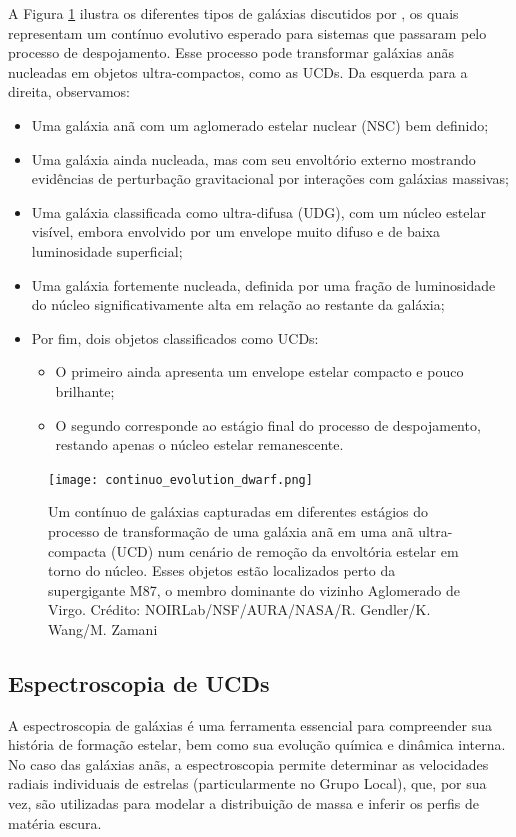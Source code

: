 A Figura \ref{continuo_evolution_dwarf} ilustra os diferentes tipos de galáxias discutidos por \cite{Wang_2023}, os quais representam um contínuo evolutivo esperado para sistemas que passaram pelo processo de despojamento. Esse processo pode transformar galáxias anãs nucleadas em objetos ultra-compactos, como as UCDs. Da esquerda para a direita, observamos:

\begin{itemize}
    \item Uma galáxia anã com um aglomerado estelar nuclear (NSC) bem definido;
    \item Uma galáxia ainda nucleada, mas com seu envoltório externo mostrando evidências de perturbação gravitacional por interações com galáxias massivas;
    \item Uma galáxia classificada como ultra-difusa (\ac{UDG}), com um núcleo estelar visível, embora envolvido por um envelope muito difuso e de baixa luminosidade superficial;
    \item Uma galáxia fortemente nucleada, definida por uma fração de luminosidade do núcleo significativamente alta em relação ao restante da galáxia;
    \item Por fim, dois objetos classificados como UCDs:
    \begin{itemize}
        \item O primeiro ainda apresenta um envelope estelar compacto e pouco brilhante;
        \item O segundo corresponde ao estágio final do processo de despojamento, restando apenas o núcleo estelar remanescente.
    \end{itemize}
\end{itemize}


\begin{figure}[!ht]
    \centering
    \texttt{[image: continuo\_evolution\_dwarf.png]} 
    \caption[]{Um contínuo de galáxias capturadas em diferentes estágios do processo de transformação de uma galáxia anã em uma anã ultra-compacta (UCD) num cenário de remoção da envoltória estelar em torno do núcleo. Esses objetos estão localizados perto da supergigante M87, o membro dominante do vizinho Aglomerado de Virgo. Crédito: NOIRLab/NSF/AURA/NASA/R. Gendler/K. Wang/M. Zamani}
    \label{continuo_evolution_dwarf}
\end{figure}

\subsection{Espectroscopia de UCDs}\label{subsec:espectroscopia}
A espectroscopia de galáxias é uma ferramenta essencial para compreender sua história de formação estelar, bem como sua evolução química e dinâmica interna. No caso das galáxias anãs, a espectroscopia permite determinar as velocidades radiais individuais de estrelas (particularmente no Grupo Local), que, por sua vez, são utilizadas para modelar a distribuição de massa e inferir os perfis de matéria escura.

